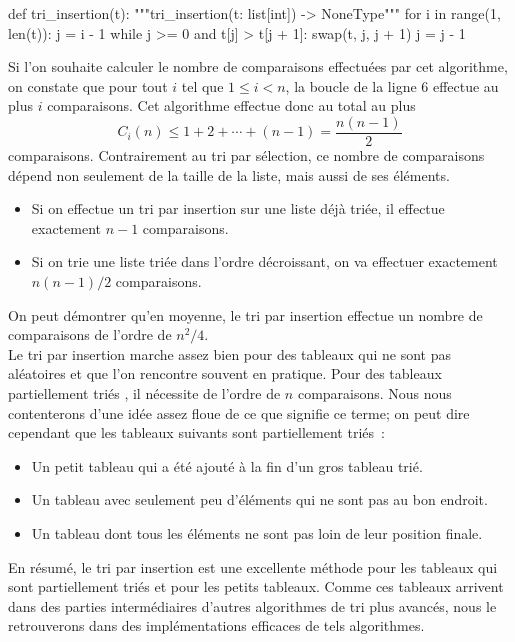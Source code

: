 \documentclass{magnolia}
\begin{document}
\begin{pythoncode}
def tri_insertion(t):
    """tri_insertion(t: list[int]) -> NoneType"""
    for i in range(1, len(t)):
        j = i - 1
        while j >= 0 and t[j] > t[j + 1]:
            swap(t, j, j + 1)
            j = j - 1
\end{pythoncode}
\noindent
Si l'on souhaite calculer le nombre de comparaisons effectuées par cet algorithme, on constate que
pour tout $i$ tel que $1\leq i<n$, la boucle de la ligne 6 effectue au plus $i$ comparaisons. Cet
algorithme effectue donc au total au plus
\[C_i(n) \leq 1+2+\cdots+(n-1)=\frac{n(n-1)}{2}\]
comparaisons. Contrairement au tri par sélection, ce nombre de comparaisons dépend non seulement de la taille de la liste, mais aussi de ses éléments.
\begin{itemize}
\item Si on effectue un tri par insertion sur une liste déjà triée, il effectue exactement $n-1$
  comparaisons.
\item Si on trie une liste triée dans l'ordre décroissant, on va effectuer
  exactement $n(n-1)/2$ comparaisons.
\end{itemize}
On peut démontrer qu'en moyenne, le tri par insertion effectue un nombre de comparaisons de l'ordre de $n^2/4$.\\

Le tri par insertion marche assez bien pour des tableaux qui ne sont pas aléatoires
et que l'on rencontre souvent en pratique. Pour des tableaux \og partiellement triés \fg, il
nécessite de l'ordre de $n$ comparaisons. Nous nous contenterons d'une idée assez floue de ce que
signifie ce terme; on peut dire cependant que les tableaux suivants sont partiellement triés~:
\begin{itemize}
\item Un petit tableau qui a été ajouté à la fin d'un gros tableau trié.
\item Un tableau avec seulement peu d'éléments qui ne sont pas au bon endroit.
\item Un tableau dont tous les éléments ne sont pas loin de leur position finale.
\end{itemize}
En résumé, le tri par insertion est une excellente méthode pour les tableaux qui
sont partiellement triés et pour les petits tableaux. Comme ces tableaux
arrivent dans des parties intermédiaires d'autres algorithmes de tri plus avancés,
nous le retrouverons dans des implémentations efficaces de tels algorithmes.
\end{document}
